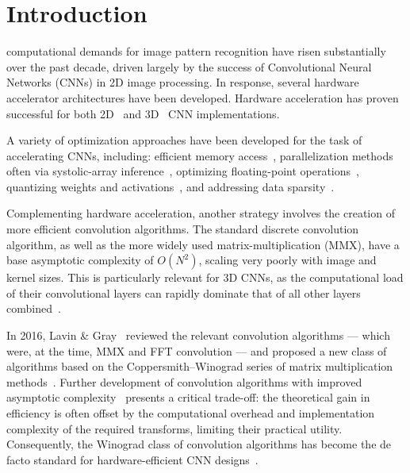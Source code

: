 \ifCLASSOPTIONcompsoc
\else
  \section{Introduction}
\fi
   computational demands for image pattern recognition have risen substantially over the past decade, driven largely by the success of Convolutional Neural Networks (CNNs) in 2D image processing. In response, several hardware accelerator architectures have been developed. Hardware acceleration has proven successful for both 2D~\cite{mittal2020survey} and 3D~\cite{mittal2021survey} CNN implementations.

  A variety of optimization approaches have been developed for the task of accelerating CNNs, including: efficient memory access~\cite{han2016cnn,jiang2021optimized,doumet2024h2pipe}, parallelization methods~\cite{jouppi2020domain,choquette2021nvidia} often via systolic-array inference~\cite{chua2022systolic}, optimizing floating-point operations~\cite{fan2021high}, quantizing weights and activations~\cite{finotti2021quant,he2023research,salah2025post}, and addressing data sparsity~\cite{jiang2021optimized,fan2021high}.

  Complementing hardware acceleration, another strategy involves the creation of more efficient convolution algorithms. The standard discrete convolution algorithm, as well as the more widely used matrix-multiplication (MMX), have a base asymptotic complexity of $O(N^2)$, scaling very poorly with image and kernel sizes. This is particularly relevant for 3D CNNs, as the computational load of their convolutional layers can rapidly dominate that of all other layers combined~\cite{hegde2018morph}.

  In 2016, Lavin \& Gray~\cite{lavin2016fast} reviewed the relevant convolution algorithms --- which were, at the time, MMX and FFT convolution --- and proposed a new class of algorithms based on the Coppersmith–Winograd series of matrix multiplication methods~\cite{coppersmith1982asymptotic}. Further development of convolution algorithms with improved asymptotic complexity~\cite{karstadt2020matrix,schwartz2023pebbling} presents a critical trade-off: the theoretical gain in efficiency is often offset by the computational overhead and implementation complexity of the required transforms, limiting their practical utility. Consequently, the Winograd class of convolution algorithms has become the de facto standard for hardware-efficient CNN designs~\cite{shen2018towards,barabasz2019winograd,vardhana2025high}.

